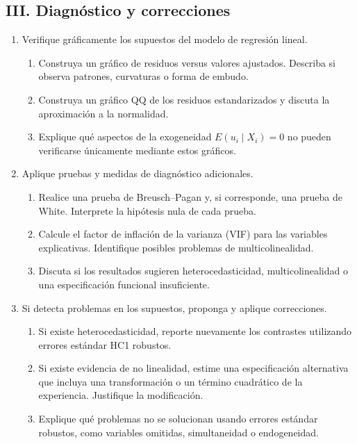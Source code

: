 \documentclass[letterpaper,11pt]{article}
\begin{document}
\subsection*{III. Diagnóstico y correcciones}

\begin{enumerate}[resume]

\item Verifique gráficamente los supuestos del modelo de regresión lineal.
    \begin{enumerate}[label=(\alph*)]
        \item Construya un gráfico de residuos versus valores ajustados.
              Describa si observa patrones, curvaturas o forma de embudo.
        \item Construya un gráfico QQ de los residuos estandarizados y discuta
              la aproximación a la normalidad.
        \item Explique qué aspectos de la exogeneidad
              $E(u_i\mid X_i)=0$ no pueden verificarse únicamente mediante
              estos gráficos.
    \end{enumerate}

\item Aplique pruebas y medidas de diagnóstico adicionales.
    \begin{enumerate}[label=(\alph*)]
        \item Realice una prueba de Breusch--Pagan y, si corresponde, una
              prueba de White. Interprete la hipótesis nula de cada prueba.
        \item Calcule el factor de inflación de la varianza (VIF) para las
              variables explicativas. Identifique posibles problemas de
              multicolinealidad.
        \item Discuta si los resultados sugieren heterocedasticidad,
              multicolinealidad o una especificación funcional insuficiente.
    \end{enumerate}

\item Si detecta problemas en los supuestos, proponga y aplique correcciones.
    \begin{enumerate}[label=(\alph*)]
        \item Si existe heterocedasticidad, reporte nuevamente los contrastes
              utilizando errores estándar HC1 robustos.
        \item Si existe evidencia de no linealidad, estime una especificación
              alternativa que incluya una transformación o un término
              cuadrático de la experiencia. Justifique la modificación.
        \item Explique qué problemas no se solucionan usando errores estándar
              robustos, como variables omitidas, simultaneidad o endogeneidad.
    \end{enumerate}

\end{enumerate}
\end{document}
